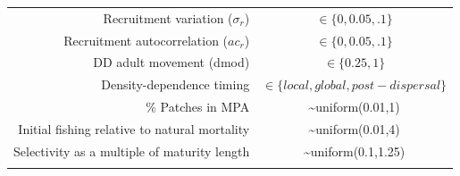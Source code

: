 \documentclass[]{article}
\begin{document}
\begin{longtable}[]{@{}rc@{}}
\begin{minipage}[t]{0.41\columnwidth}
Recruitment variation (\(\sigma_{r}\))\strut
\end{minipage} & \begin{minipage}[t]{0.53\columnwidth}\centering
\(\in\{0,0.05,.1\}\)\strut
\end{minipage}\tabularnewline
\begin{minipage}[t]{0.41\columnwidth}\raggedleft
Recruitment autocorrelation (\(ac_{r}\))\strut
\end{minipage} & \begin{minipage}[t]{0.53\columnwidth}\centering
\(\in\{0,0.05,.1\}\)\strut
\end{minipage}\tabularnewline
\begin{minipage}[t]{0.41\columnwidth}\raggedleft
DD adult movement (dmod)\strut
\end{minipage} & \begin{minipage}[t]{0.53\columnwidth}\centering
\(\in\{0.25,1\}\)\strut
\end{minipage}\tabularnewline
\begin{minipage}[t]{0.41\columnwidth}\raggedleft
Density-dependence timing\strut
\end{minipage} & \begin{minipage}[t]{0.53\columnwidth}\centering
\(\in\{local, global,post-dispersal\}\)\strut
\end{minipage}\tabularnewline
\begin{minipage}[t]{0.41\columnwidth}\raggedleft
\% Patches in MPA\strut
\end{minipage} & \begin{minipage}[t]{0.53\columnwidth}\centering
\textasciitilde{}uniform(0.01,1)\strut
\end{minipage}\tabularnewline
\begin{minipage}[t]{0.41\columnwidth}\raggedleft
Initial fishing relative to natural mortality\strut
\end{minipage} & \begin{minipage}[t]{0.53\columnwidth}\centering
\textasciitilde{}uniform(0.01,4)\strut
\end{minipage}\tabularnewline
\begin{minipage}[t]{0.41\columnwidth}\raggedleft
Selectivity as a multiple of maturity length\strut
\end{minipage} & \begin{minipage}[t]{0.53\columnwidth}\centering
\textasciitilde{}uniform(0.1,1.25)\strut
\end{minipage}\tabularnewline
\begin{minipage}[t]{0.41\columnwidth}\raggedleft

\end{minipage}
\end{longtable}
\end{document}
